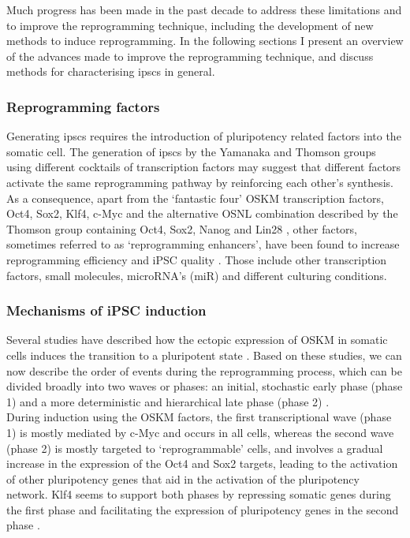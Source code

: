 Much progress has been made in the past decade to address these limitations and to improve the reprogramming technique, including the development of new methods to induce reprogramming. 
In the following sections I present an overview of the advances made to improve the reprogramming technique, and discuss methods for characterising \glspl{ipsc} in general. 

\subsubsection{Reprogramming factors}

Generating \glspl{ipsc} requires the introduction of pluripotency related factors into the somatic cell. 
The generation of \glspl{ipsc} by the Yamanaka and Thomson groups using different cocktails of transcription factors may suggest that different factors activate the same reprogramming pathway by reinforcing each other’s synthesis.
As a consequence, apart from the `fantastic four' OSKM transcription factors, Oct4, Sox2, Klf4, c-Myc and the alternative OSNL combination described by the Thomson group containing Oct4, Sox2, Nanog and Lin28 \cite{yu2007induced}, other factors, sometimes referred to as `reprogramming enhancers', have been found to increase reprogramming efficiency and iPSC quality \cite{takahashi2016decade}.
Those include other transcription factors, small molecules, microRNA’s (miR) and different culturing conditions. 


\subsubsection{Mechanisms of iPSC induction}

Several studies have described how the ectopic expression of OSKM in somatic cells induces the transition to a pluripotent state \cite{yamanaka2007strategies, brambrink2008sequential, stadtfeld2008induced, polo2012molecular, hansson2012highly, buganim2012single}. 
Based on these studies, we can now describe the order of events during the reprogramming process, which can be divided broadly into two waves or phases: an initial, stochastic early phase (phase 1) and a more deterministic and hierarchical late phase (phase 2) \cite{omole2018ten, takahashi2016decade, brouwer2016choices}.\\

During induction using the OSKM factors, the first transcriptional wave (phase 1) is mostly mediated by c-Myc and occurs in all cells, whereas the second wave (phase 2) is mostly targeted to `reprogrammable' cells, and involves a gradual increase in the expression of the Oct4 and Sox2 targets, leading to the activation of other pluripotency genes that aid in the activation of the pluripotency network. 
Klf4 seems to support both phases by repressing somatic genes during the first phase and facilitating the expression of pluripotency genes in the second phase \cite{buganim2013mechanisms}.\\


